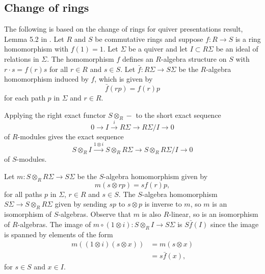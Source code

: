 \documentclass[a4paper, 11pt, twoside]{report}
\begin{document}
\subsection{Change of rings}

The following is based on the change of rings for quiver presentations result, Lemma 5.2 in \cite{su15}. Let $R$ and $S$ be commutative rings and suppose $f\colon R\to S$ is a ring homomorphism with $f(1)=1$. Let $\Sigma$ be a quiver and let $I\subset R\Sigma$ be an ideal of relations in $\Sigma$. The homomorphism $f$ defines an $R$-algebra structure on $S$ with $r\cdot s = f(r)s$ for all $r\in R$ and $s\in S$. Let $\bar{f}\colon R\Sigma\to S\Sigma$ be the $R$-algebra homomorphism induced by $f$, which is given by
\begin{equation*}
\bar{f}(rp)=f(r)p
\end{equation*}
for each path $p$ in $\Sigma$ and $r\in R$.

Applying the right exact functor $S\otimes_R -$ to the short exact sequence
\begin{equation*}
0\to I \overset{i}\to R\Sigma \to R\Sigma/{I} \to 0
\end{equation*}
of $R$-modules gives the exact sequence
\begin{equation*}
S\otimes_R I \overset{1\otimes i}\to S\otimes_R R\Sigma \to S\otimes_R R\Sigma/{I} \to 0
\end{equation*}
of $S$-modules.

Let $m\colon S\otimes_R R\Sigma\to S\Sigma$ be the $S$-algebra homomorphism given by
\begin{equation*}
m(s\otimes rp) = sf(r)p,
\end{equation*}
for all paths $p$ in $\Sigma$, $r\in R$ and $s\in S$. The $S$-algebra homomorphism $S\Sigma\to S\otimes_R R\Sigma$ given by sending $sp$ to $s\otimes p$ is inverse to $m$, so $m$ is an isomorphism of $S$-algebras. Observe that $m$ is also $R$-linear, so is an isomorphism of $R$-algebras. The image of $m\circ (1\otimes i)\colon S\otimes_R I \to S\Sigma$ is $S\bar{f}{(I)}$ since the image is spanned by elements of the form
\begin{align*}
m((1\otimes i)(s\otimes x))
&= m(s\otimes x)\\
&= s\bar{f}{(x)},
\end{align*}
for $s\in S$ and $x\in I$.
\end{document}
